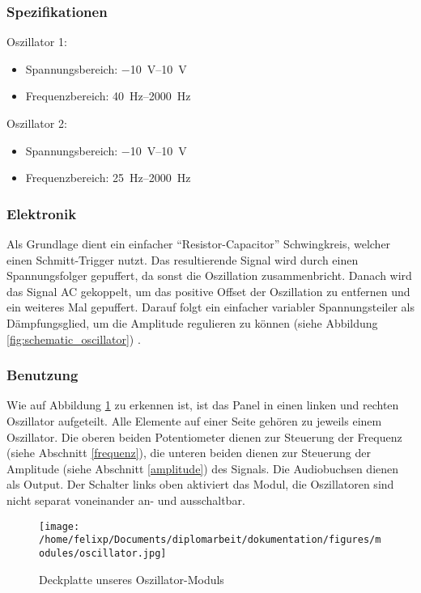 \subsubsection{Spezifikationen}
\label{sec:orge1aaaad}
Oszillator 1:
\begin{itemize}
\item Spannungsbereich: \SIrange{-10}{+10}{\volt}
\item Frequenzbereich: \SIrange{40}{2000}{\hertz}
\end{itemize}

Oszillator 2:
\begin{itemize}
\item Spannungsbereich: \SIrange{-10}{+10}{\volt}
\item Frequenzbereich: \SIrange{25}{2000}{\hertz}
\end{itemize}

\subsubsection{Elektronik}
\label{sec:orgcfe8fe5}
Als Grundlage dient ein einfacher "`Resistor-Capacitor"' Schwingkreis, welcher einen Schmitt-Trigger nutzt. Das resultierende Signal wird durch einen Spannungsfolger gepuffert, da sonst die Oszillation zusammenbricht. Danach wird das Signal AC gekoppelt, um das positive Offset der Oszillation zu entfernen und ein weiteres Mal gepuffert. Darauf folgt ein einfacher variabler Spannungsteiler als Dämpfungsglied, um die Amplitude regulieren zu können (siehe Abbildung \ref{fig:schematic_oscillator}) \cite{klein:osci}. 

\subsubsection{Benutzung}
\label{sec:org84d49d4}
Wie auf Abbildung \ref{fig:org98dc04b} zu erkennen ist, ist das Panel in einen linken und rechten Oszillator aufgeteilt. Alle Elemente auf einer Seite gehören zu jeweils einem Oszillator. Die oberen beiden Potentiometer dienen zur Steuerung der Frequenz (siehe Abschnitt \ref{frequenz}), die unteren beiden dienen zur Steuerung der Amplitude (siehe Abschnitt \ref{amplitude}) des Signals. Die Audiobuchsen dienen als Output. Der Schalter links oben aktiviert das Modul, die Oszillatoren sind nicht separat voneinander an- und ausschaltbar.

\begin{figure}[hp]
\centering
\texttt{[image: /home/felixp/Documents/diplomarbeit/dokumentation/figures/modules/oscillator.jpg]}
\caption{\label{fig:org98dc04b}Deckplatte unseres Oszillator-Moduls}
\end{figure}

